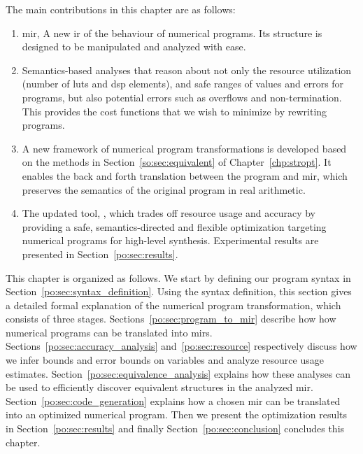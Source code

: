 The main contributions in this chapter are as follows:
\begin{enumerate}

    \item \acrfull{mir}, A new \gls{ir} of the behaviour of numerical programs.
    Its structure is designed to be manipulated and analyzed with ease.

    \item Semantics-based analyses that reason about not only the resource
    utilization (number of \glspl{lut} and \gls{dsp} elements), and safe ranges
    of values and errors for programs, but also potential errors such as
    overflows and non-termination.  This provides the cost functions that we
    wish to minimize by rewriting programs.

    \item A new framework of numerical program transformations is
    developed based on the methods in Section~\ref{so:sec:equivalent} of
    Chapter~\ref{chp:stropt}.  It enables the back and forth translation
    between the program and \gls{mir}, which preserves the semantics of the
    original program in real arithmetic.

    \item The updated tool, \soap, which trades off resource usage and accuracy
    by providing a safe, semantics-directed and flexible optimization targeting
    numerical programs for high-level synthesis.  Experimental results are
    presented in Section~\ref{po:sec:results}.

\end{enumerate}

This chapter is organized as follows.  We start by defining our program
syntax in Section~\ref{po:sec:syntax_definition}.  Using the syntax
definition, this section gives a detailed formal explanation of the
numerical program transformation, which consists of three stages.
Sections~\ref{po:sec:program_to_mir} describe how how numerical programs can
be translated into \glspl{mir}.  Sections~\ref{po:sec:accuracy_analysis}
and~\ref{po:sec:resource} respectively discuss how we infer bounds
and error bounds on variables and analyze resource usage estimates.
Section~\ref{po:sec:equivalence_analysis} explains how these analyses can
be used to efficiently discover equivalent structures in the analyzed
\gls{mir}\@.  Section~\ref{po:sec:code_generation} explains how a chosen
\gls{mir} can be translated into an optimized numerical program.  Then we
present the optimization results in Section~\ref{po:sec:results} and finally
Section~\ref{po:sec:conclusion} concludes this chapter.
